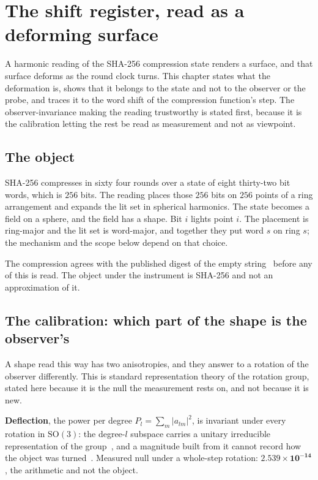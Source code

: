 \chapter{The shift register, read as a deforming surface}

A harmonic reading of the SHA-256 compression state renders a surface, and that surface deforms as the round clock turns. This chapter states what the deformation is, shows that it belongs to the state and not to the observer or the probe, and traces it to the word shift of the compression function's step. The observer-invariance making the reading trustworthy is stated first, because it is the calibration letting the rest be read as measurement and not as viewpoint.

\section{The object}

SHA-256 compresses in sixty four rounds over a state of eight thirty-two bit words, which is \(256\) bits. The reading places those \(256\) bits on \(256\) points of a ring arrangement and expands the lit set in spherical harmonics. The state becomes a field on a sphere, and the field has a shape. Bit \(i\) lights point \(i\). The placement is ring-major and the lit set is word-major, and together they put word \(s\) on ring \(s\); the mechanism and the scope below depend on that choice.

The compression agrees with the published digest of the empty string~\cite{src:FIPS-180-4} before any of this is read. The object under the instrument is SHA-256 and not an approximation of it.

\section{The calibration: which part of the shape is the observer's}

A shape read this way has two anisotropies, and they answer to a rotation of the observer differently. This is standard representation theory of the rotation group, stated here because it is the null the measurement rests on, and not because it is new.

\textbf{Deflection}, the power per degree \(P_l = \sum_m |a_{lm}|^2\), is invariant under every rotation in \(\mathrm{SO}(3)\): the degree-\(l\) subspace carries a unitary irreducible representation of the group~\cite{src:Edmonds-1957}, and a magnitude built from it cannot record how the object was turned~\cite{src:Kazhdan-Funkhouser-and-Rusinkiewicz-2003}. Measured null under a whole-step rotation: \(\mathbf{2.539 \times 10^{-14}}\), the arithmetic and not the object.

